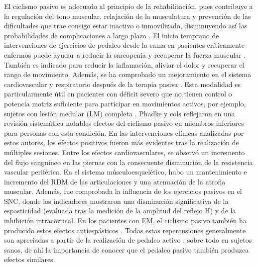 El ciclismo pasivo es adecuado al principio de la rehabilitación, pues contribuye a la regulación del tono muscular, relajación de la musculatura y prevención de las dificultades que trae consigo estar inactivo o inmovilizado, disminuyendo así las probabilidades de
complicaciones a largo plazo \cite{cruz2009guia}. El inicio temprano de intervenciones de ejercicios de pedaleo desde la cama en pacientes críticamente enfermos puede ayudar a reducir la sarcopenia y recuperar la fuerza muscular \cite{nickels2020acceptability}. También es indicado para reducir la inflamación, aliviar el dolor y recuperar el rango de movimiento. Además, se ha comprobado un mejoramiento en el sistema cardiovascular y respiratorio después de la terapia pasiva \cite{cruz2009guia, phadke2019impact}.
Esta modalidad es particularmente útil en pacientes con déficit severo que no tienen control o potencia motriz suficiente para participar en movimientos activos, por ejemplo, sujetos con lesión medular (LM) completa \cite{phadke2019impact, nardone2017passive}. Phadke y cols \cite{phadke2019impact} reflejaron en una revisión sistemática notables efectos del ciclismo pasivo en miembros inferiores para personas con esta condición. En las intervenciones clínicas analizadas por estos autores, los efectos positivos fueron más evidentes tras la realización de múltiples sesiones. Entre los efectos cardiovasculares, se observó un incremento del flujo sanguíneo en las piernas con la consecuente disminución de la resistencia vascular periférica. En el sistema músculoesquelético, hubo un mantenimiento e incremento del RDM de las articulaciones y una atenuación de la atrofia muscular. Además, fue comprobada la influencia de los ejercicios pasivos en el SNC, donde los indicadores mostraron una disminución significativa de la espasticidad (evaluada tras la medición de la amplitud del reflejo H) y de la inhibición intracortical. En los pacientes con EM, el ciclismo pasivo también ha producido estos efectos antiespásticos \cite{motl2006effect, guyot2012effects}. Todas estas repercusiones generalmente son apreciadas a partir de la realización de pedaleo activo \cite{nardone2016effects}, sobre todo en sujetos sanos, de ahí la importancia de conocer que el pedaleo pasivo también produzca efectos similares.

